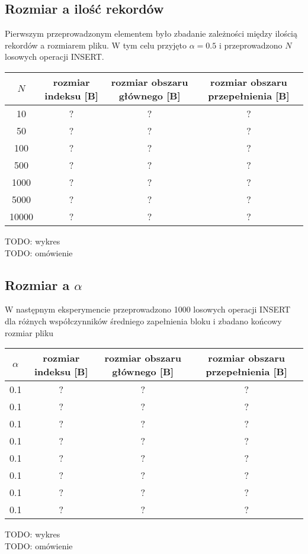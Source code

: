 \documentclass{article}
\begin{document}
\subsection{Rozmiar a ilość rekordów}
Pierwszym przeprowadzonym elementem było zbadanie zależności między ilością rekordów a rozmiarem pliku.  W tym celu przyjęto $\alpha = 0.5$ i przeprowadzono $N$ losowych operacji INSERT.
\begin{center}
\begin{tabular}{ c | c c c }
 $N$ & rozmiar indeksu [B] & rozmiar obszaru głównego [B] & rozmiar obszaru przepełnienia [B]  \\ 
\hline
  10 & ? & ? & ? \\
  50 & ? & ? & ? \\
  100 & ? & ? & ? \\
  500  & ? & ? & ? \\
  1000 & ? & ? & ? \\
  5000 & ? & ? & ? \\
  10000 & ? & ? & ? \\
\end{tabular}
\end{center}
TODO: wykres \\
TODO: omówienie
\subsection{Rozmiar a $\alpha$}
W następnym eksperymencie przeprowadzono 1000 losowych operacji INSERT dla różnych współczynników średniego zapełnienia bloku i zbadano końcowy rozmiar pliku
\begin{center}
\begin{tabular}{ c | c c c }
 $\alpha$ & rozmiar indeksu [B] & rozmiar obszaru głównego [B] & rozmiar obszaru przepełnienia [B]  \\ 
\hline
  0.1 & ? & ? & ? \\
   0.1 & ? & ? & ? \\
  0.1 & ? & ? & ? \\
  0.1 & ? & ? & ? \\
  0.1 & ? & ? & ? \\
  0.1 & ? & ? & ? \\
  0.1 & ? & ? & ? \\
  0.1 & ? & ? & ? 
\end{tabular}
\end{center}
TODO: wykres \\
TODO: omówienie
\end{document}
